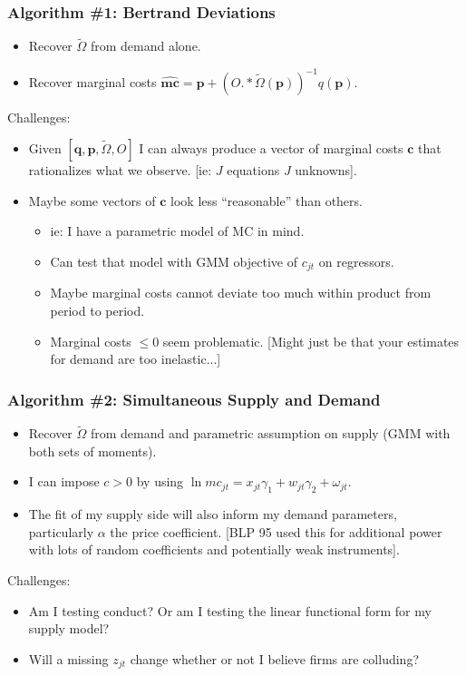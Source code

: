 \documentclass[xcolor=pdftex,dvipsnames,table,mathserif,aspectratio=169]{beamer}
\begin{document}
\begin{frame}
\frametitle{Algorithm \#1: Bertrand Deviations}

\begin{itemize}
\item Recover $\tilde{\Omega}$ from demand alone.
\item Recover marginal costs $\widehat{\mathbf{mc}} = \mathbf{p} +(O.*\tilde{\Omega}(\mathbf{p}))^{-1} q(\mathbf{p})$.
\end{itemize}
Challenges:
\begin{itemize}
\item Given $[\mathbf{q},\mathbf{p},\tilde{\Omega},O]$ I can always produce a vector of marginal costs $\mathbf{c}$ that rationalizes what we observe. [ie: $J$ equations $J$ unknowns].
\item Maybe some vectors of $\mathbf{c}$ look less ``reasonable'' than others.
\begin{itemize}
\item ie: I have a parametric model of MC in mind. 
\item Can test that model with GMM objective of $c_{jt}$ on regressors.
\item Maybe marginal costs cannot deviate too much within product from period to period.
\item Marginal costs $\leq 0$ seem problematic. [Might just be that your estimates for demand are too inelastic...]
\end{itemize}
\end{itemize}
\end{frame}

\begin{frame}
\frametitle{Algorithm \#2: Simultaneous Supply and Demand}
\begin{itemize}
\item Recover $\tilde{\Omega}$ from demand and parametric assumption on supply (GMM with both sets of moments).
\item I can impose $c > 0$ by using $\ln mc_{jt} = x_{jt} \gamma_1 + w_{jt} \gamma_2 + \omega_{jt}$.
\item The fit of my supply side will also inform my demand parameters, particularly $\alpha$ the price coefficient. [BLP 95 used this for additional power with lots of random coefficients and potentially weak instruments].
\end{itemize}
Challenges:
\begin{itemize}
\item Am I testing conduct? Or am I testing the linear functional form for my supply model?
\item Will a missing $z_{jt}$ change whether or not I believe firms are colluding?
\end{itemize}
\end{frame}
\end{document}
